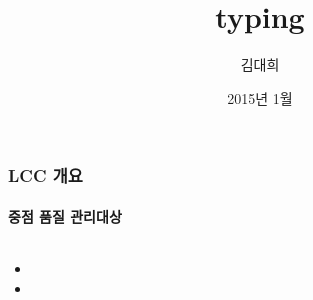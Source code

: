 \documentclass[12pt,a4paper]{book}
\begin{document}
	
			\dominitoc

			\title{typing}
			\author{김대희}
			\date{2015년 1월}
			\maketitle


			\tableofcontents
			\listoffigures
			\listoftables

			


\newpage
\part{ }

\newpage
\chapter{ }

\newpage  \null
\section{LCC 개요}


		\newpage
		\minitoc				%
		\doublespace



		\newpage   \null
		\subsection{중점 품질 관리대상}


		\newpage
	\newpage
	\paragraph{\large }


			\begin{itemize}[itemsep=0.0em]
			\item	
			\item	
			\end{itemize}
\end{document}
